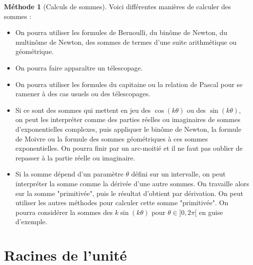 \documentclass[french]{book}
\theoremstyle{plain}
\theoremstyle{definition}
\newtheorem{met}{Méthode}[chapter]
\theoremstyle{remark}
\begin{document}
\begin{met}[Calculs de sommes]
	Voici différentes manières de calculer des sommes :
	\begin{itemize}
		\item On pourra utiliser les formules de Bernoulli, du binôme de Newton, du multinôme de Newton, des sommes de termes d'une suite arithmétique ou géométrique.
		\item On pourra faire apparaître un télescopage.
		\item On pourra utiliser les formules du capitaine ou la relation de Pascal pour se ramener à des cas usuels ou des télescopages.
		\item Si ce sont des sommes qui mettent en jeu des $\cos(k\theta)$ ou des $\sin(k\theta)$, on peut les interpréter comme des parties réelles ou imaginaires de sommes d'exponentielles complexes, puis appliquer le binôme de Newton, la formule de Moivre ou la formule des sommes géométriques à ces sommes exponentielles. On pourra finir par un arc-moitié et il ne faut pas oublier de repasser à la partie réelle ou imaginaire.
		\item Si la somme dépend d'un paramètre $\theta$ défini sur un intervalle, on peut interpréter la somme comme la dérivée d'une autre sommes. On travaille alors sur la somme "primitivée", puis le résultat d'obtient par dérivation. On peut utiliser les autres méthodes pour calculer cette somme "primitivée". On pourra considérer la sommes des $k\sin(k\theta)$ pour $\theta\in]0,2\pi[$ en guise d'exemple.
	\end{itemize}
\end{met}
\section{Racines de l'unité}
\end{document}
